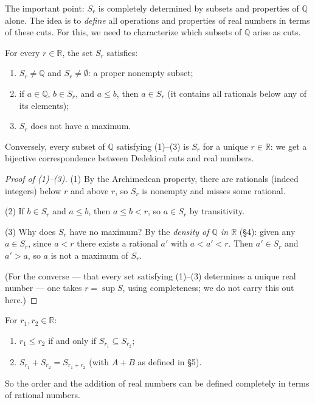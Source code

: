 \documentclass[11pt]{report}
\begin{document}
The important point: $S_r$ is completely determined by subsets and properties of $\mathbb{Q}$ alone. The idea is to \emph{define} all operations and properties of real numbers in terms of these cuts. For this, we need to characterize which subsets of $\mathbb{Q}$ arise as cuts.

\begin{propbox}
For every $r \in \mathbb{R}$, the set $S_r$ satisfies:
\begin{enumerate}[label=(\arabic*)]
    \item $S_r \neq \mathbb{Q}$ and $S_r \neq \emptyset$: a proper nonempty subset;
    \item if $a \in \mathbb{Q}$, $b \in S_r$, and $a \leq b$, then $a \in S_r$ (it contains all rationals below any of its elements);
    \item $S_r$ does not have a maximum.
\end{enumerate}
Conversely, every subset of $\mathbb{Q}$ satisfying (1)--(3) is $S_r$ for a unique $r \in \mathbb{R}$: we get a bijective correspondence between Dedekind cuts and real numbers.
\end{propbox}

\begin{proof}[Proof of (1)--(3)]
(1) By the Archimedean property, there are rationals (indeed integers) below $r$ and above $r$, so $S_r$ is nonempty and misses some rational.

(2) If $b \in S_r$ and $a \leq b$, then $a \leq b < r$, so $a \in S_r$ by transitivity.

(3) Why does $S_r$ have no maximum? By the \emph{density of $\mathbb{Q}$ in $\mathbb{R}$} (\S 4): given any $a \in S_r$, since $a < r$ there exists a rational $a'$ with $a < a' < r$. Then $a' \in S_r$ and $a' > a$, so $a$ is not a maximum of $S_r$.

(For the converse --- that every set satisfying (1)--(3) determines a unique real number --- one takes $r = \sup S$, using completeness; we do not carry this out here.)
\end{proof}

\begin{propbox}
For $r_1, r_2 \in \mathbb{R}$:
\begin{enumerate}[label=(\roman*)]
    \item $r_1 \leq r_2$ if and only if $S_{r_1} \subseteq S_{r_2}$;
    \item $S_{r_1} + S_{r_2} = S_{r_1 + r_2}$ (with $A + B$ as defined in \S 5).
\end{enumerate}
So the order and the addition of real numbers can be defined completely in terms of rational numbers.
\end{propbox}
\end{document}
